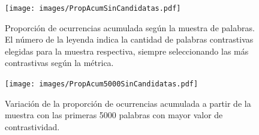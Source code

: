 

\begin{figure}[ht]\centering
    \texttt{[image: images/PropAcumSinCandidatas.pdf]}
    \caption{Proporción de ocurrencias acumulada según la muestra de palabras. El número de la leyenda indica la cantidad de palabras contrastivas elegidas para la muestra respectiva, siempre seleccionando las más contrastivas según la métrica.} 
    \label{fig:propAcum} 
\end{figure}


\begin{figure}[ht]\centering
    \texttt{[image: images/PropAcum5000SinCandidatas.pdf]}
    \caption{Variación de la proporción de ocurrencias acumulada a partir de la muestra con las primeras 5000 palabras con mayor valor de contrastividad.} 
    \label{fig:propAcum5000} 
\end{figure}

